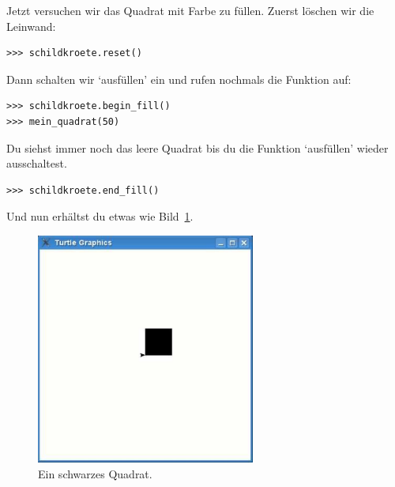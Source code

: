 \noindent
Jetzt versuchen wir das Quadrat mit Farbe zu füllen. Zuerst löschen wir die Leinwand:

\begin{Verbatim}[frame=single]
>>> schildkroete.reset()
\end{Verbatim}

\noindent
Dann schalten wir `ausfüllen' ein und rufen nochmals die Funktion  auf:

\begin{Verbatim}[frame=single]
>>> schildkroete.begin_fill()
>>> mein_quadrat(50)
\end{Verbatim}

\noindent
Du siehst immer noch das leere Quadrat bis du die Funktion `ausfüllen' wieder ausschaltest.

\begin{Verbatim}[frame=single]
>>> schildkroete.end_fill()
\end{Verbatim}

\noindent
Und nun erhältst du etwas wie Bild~\ref{fig27}.

\begin{figure}
\begin{center}
\includegraphics[width=72mm]{images/figure27}
\end{center}
\caption{Ein schwarzes Quadrat.}\label{fig27}
\end{figure}

